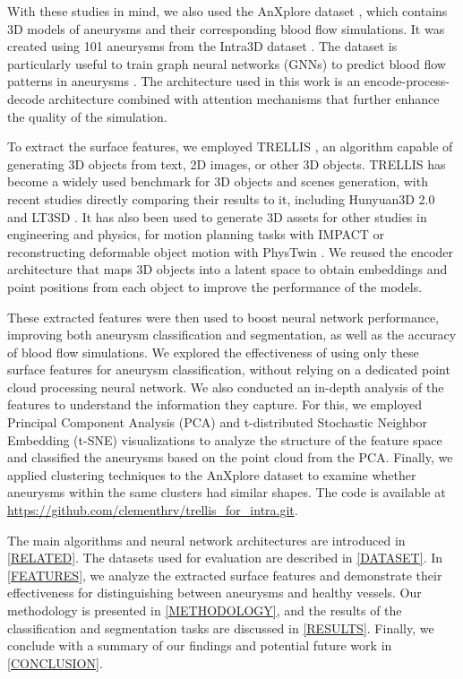 \documentclass[%
 reprint,
 amsmath,amssymb,
 aps,
 floatfix,
 nofootinbib,
]{revtex4-2}
\begin{document}
With these studies in mind, we also used the AnXplore dataset \citep{anxplore}, which contains 3D models of aneurysms and their corresponding blood flow simulations. It was created using 101 aneurysms from the Intra3D dataset \citep{yang2020intra}. The dataset is particularly useful to train graph neural networks \citep{pfaff2021learningmeshbasedsimulationgraph} (GNNs) to predict blood flow patterns in aneurysms \citep{graphphysics}. The architecture used in this work is an encode-process-decode architecture combined with attention mechanisms \citep{VaswaniSPUJGKP17} that further enhance the quality of the simulation.

To extract the surface features, we employed TRELLIS \citep{xiang2024structured}, an algorithm capable of generating 3D objects from text, 2D images, or other 3D objects. TRELLIS \citep{xiang2024structured} has become a widely used benchmark for 3D objects and scenes generation, with recent studies directly comparing their results to it, including Hunyuan3D 2.0 \citep{zhao2025hunyuan3d20scalingdiffusion} and LT3SD \citep{2024arXiv240908215M}. It has also been used to generate 3D assets for other studies in engineering and physics, for motion planning tasks with IMPACT \citep{ling2025impactintelligentmotionplanning} or reconstructing deformable object motion with PhysTwin \citep{jiang2025phystwinphysicsinformedreconstructionsimulation}. We reused the encoder architecture that maps 3D objects into a latent space to obtain embeddings and point positions from each object to improve the performance of the models.

These extracted features were then used to boost neural network performance, improving both aneurysm classification and segmentation, as well as the accuracy of blood flow simulations. We explored the effectiveness of using only these surface features for aneurysm classification, without relying on a dedicated point cloud processing neural network. We also conducted an in-depth analysis of the features to understand the information they capture. For this, we employed Principal Component Analysis (PCA) and t-distributed Stochastic Neighbor Embedding (t-SNE) visualizations to analyze the structure of the feature space and classified the aneurysms based on the point cloud from the PCA. Finally, we applied clustering techniques to the AnXplore dataset to examine whether aneurysms within the same clusters had similar shapes. The code is available at \url{https://github.com/clementhrv/trellis_for_intra.git}.

The main algorithms and neural network architectures are introduced in \autoref{RELATED}. The datasets used for evaluation are described in \autoref{DATASET}. In \autoref{FEATURES}, we analyze the extracted surface features and demonstrate their effectiveness for distinguishing between aneurysms and healthy vessels. Our methodology is presented in \autoref{METHODOLOGY}, and the results of the classification and segmentation tasks are discussed in \autoref{RESULTS}. Finally, we conclude with a summary of our findings and potential future work in \autoref{CONCLUSION}.
\end{document}
